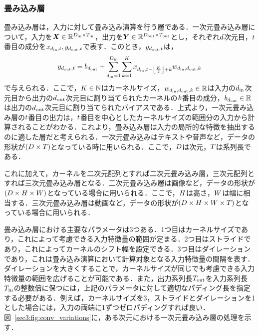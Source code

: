 \subsubsection{畳み込み層}
畳み込み層は，入力に対して畳み込み演算を行う層である．一次元畳み込み層について，入力を$\bm{X} \in \mathbb{R}^{D_{\text{in}} \times T_{\text{in}}}$，出力を$\bm{Y} \in \mathbb{R}^{D_{\text{out}} \times T_{\text{out}}}$とし，それぞれ$d$次元目，$t$番目の成分を$x_{d_{\text{in}}, t}, y_{d_{\text{out}}, t}$で表す．このとき，$y_{d_{\text{out}}, t}$は，
\begin{align}
    y_{d_{\text{out}}, t} = b_{d_{\text{out}}} + \sum_{d_{\text{in}} = 1}^{D_{\text{in}}} \sum_{k = 1}^{K} x_{d_{\text{in}}, t - \left\lfloor\frac{K}{2}\right\rfloor + k} w_{d_{\text{in}}, d_{\text{out}}, k}
\end{align}
で与えられる．ここで，$K \in \mathbb{N}$はカーネルサイズ，$w_{d_{\text{in}}, d_{\text{out}}, k} \in \mathbb{R}$は入力の$d_{\text{in}}$次元目から出力の$d_{\text{out}}$次元目に割り当てられたカーネルの$k$番目の成分，$b_{d_{\text{out}}} \in \mathbb{R}$は出力の$d_{\text{out}}$次元目に割り当てられたバイアスである．上式より，一次元畳み込み層の$t$番目の出力は，$t$番目を中心としたカーネルサイズの範囲分の入力から計算されることがわかる．これより，畳み込み層は入力の局所的な特徴を抽出するのに適した層だと考えられる．一次元畳み込みはテキストや音声など，データの形状が$\left(D \times T\right)$となっている時に用いられる．ここで，$D$は次元，$T$は系列長である．

これに加えて，カーネルを二次元配列とすれば二次元畳み込み層，三次元配列とすれば三次元畳み込み層となる．二次元畳み込み層は画像など，データの形状が$\left(D \times H \times W\right)$となっている場合に用いられる．ここで，$H$は高さ，$W$は幅に相当する．三次元畳み込み層は動画など，データの形状が$\left(D \times H \times W \times T\right)$となっている場合に用いられる．

畳み込み層における主要なパラメータは3つある．1つ目はカーネルサイズであり，これによって考慮できる入力特徴量の範囲が定まる．2つ目はストライドであり，これによってカーネルのシフト幅を設定できる．3つ目はダイレーションであり，これは畳み込み演算において計算対象となる入力特徴量の間隔を表す．ダイレーションを大きくすることで，カーネルサイズが同じでも考慮できる入力特徴量の範囲を広げることが可能である．また，出力系列長$T_{\text{out}}$を入力系列長$T_{\text{in}}$の整数倍に保つには，上記のパラメータに対して適切なパディング長を指定する必要がある．例えば，カーネルサイズを3，ストライドとダイレーションを1とした場合には，入力の両端に1ずつゼロパディングすれば良い．図~\ref{sec3:fig:conv_variations}に，ある次元における一次元畳み込み層の処理を示す．

